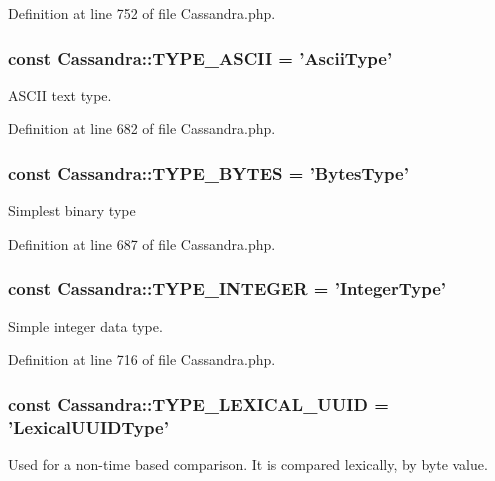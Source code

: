 Definition at line 752 of file Cassandra.php.

\hypertarget{classCassandra_acc917786b5bbbdd6eb4783856bd5580c}{
\subsubsection[{TYPE\_\-ASCII}]{\setlength{\rightskip}{0pt plus 5cm}const {\bf Cassandra::TYPE\_\-ASCII} = 'AsciiType'}}
\label{classCassandra_acc917786b5bbbdd6eb4783856bd5580c}
ASCII text type. 

Definition at line 682 of file Cassandra.php.

\hypertarget{classCassandra_ab75de9aa0588c7665f1c9d8cf8d4e8ff}{
\subsubsection[{TYPE\_\-BYTES}]{\setlength{\rightskip}{0pt plus 5cm}const {\bf Cassandra::TYPE\_\-BYTES} = 'BytesType'}}
\label{classCassandra_ab75de9aa0588c7665f1c9d8cf8d4e8ff}
Simplest binary type 

Definition at line 687 of file Cassandra.php.

\hypertarget{classCassandra_a4160c654a18aead3a642fd1f3f2415e9}{
\subsubsection[{TYPE\_\-INTEGER}]{\setlength{\rightskip}{0pt plus 5cm}const {\bf Cassandra::TYPE\_\-INTEGER} = 'IntegerType'}}
\label{classCassandra_a4160c654a18aead3a642fd1f3f2415e9}
Simple integer data type. 

Definition at line 716 of file Cassandra.php.

\hypertarget{classCassandra_a2af16bdea44f4e16ba5c5baa5380b9f0}{
\subsubsection[{TYPE\_\-LEXICAL\_\-UUID}]{\setlength{\rightskip}{0pt plus 5cm}const {\bf Cassandra::TYPE\_\-LEXICAL\_\-UUID} = 'LexicalUUIDType'}}
\label{classCassandra_a2af16bdea44f4e16ba5c5baa5380b9f0}
Used for a non-\/time based comparison. It is compared lexically, by byte value.

